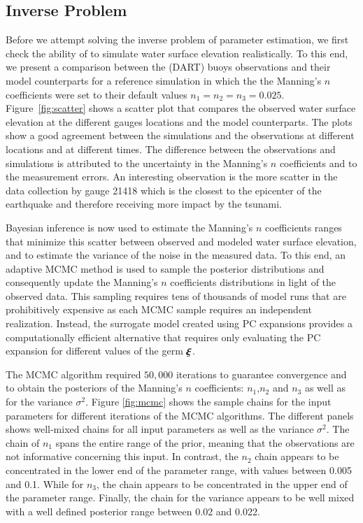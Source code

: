 \subsection{Inverse Problem} 
\label{sec:inverse}

Before we attempt solving the inverse problem of parameter estimation, 
we first check the ability of \geoclaw to simulate water surface elevation
realistically. To this end, we present a comparison between the 
(DART) buoys observations  and their \geoclaw model counterparts
for a reference simulation in which the  the Manning's $n$ coefficients were set to their default values $n_1=n_2=n_3=0.025$. Figure~\ref{fig:scatter} 
shows a scatter plot that compares the observed 
water surface elevation at the different gauges locations and the  \geoclaw model counterparts. 
The plots show a good agreement between the simulations and the 
observations at different locations and at different times. 
The difference between the observations and simulations is attributed to the uncertainty in the 
Manning's $n$ coefficients and to the measurement errors.
\alert{An interesting observation is the more scatter in the data collection by gauge 21418 which is the closest to
the epicenter of the earthquake and therefore receiving more impact by the tsunami.}

Bayesian inference is now used to estimate the Manning's 
$n$ coefficients ranges that minimize this scatter between 
observed and modeled water surface elevation, and to estimate the variance of the noise in the measured data.
To this end, an adaptive MCMC method is used to sample 
the posterior distributions \citep{Gareth2009,Haario2001} and consequently 
update the Manning's $n$ coefficients distributions in light of the 
observed data. This sampling requires tens of thousands of 
\geoclaw model runs that are prohibitively expensive as each MCMC 
sample requires an independent \geoclaw realization. Instead,
the surrogate model created using PC expansions provides a computationally
efficient alternative that requires only evaluating the PC expansion
for different values of the germ $\xxi$.

The MCMC algorithm required $50,000$ iterations to guarantee convergence
and to obtain the posteriors of the Manning's $n$ coefficients: 
$n_1$,$n_2$ and $n_3$ as well as for the variance $\sigma^2$. Figure \ref{fig:mcmc} 
shows the sample chains for the input parameters for different iterations of the MCMC algorithms. 
The different panels shows well-mixed chains for all input parameters as well as the variance $\sigma^2$.
The chain of  $n_{1}$ spans the entire range of the prior, meaning that the observations are not informative 
concerning this input.  In contrast, the $n_{2}$ chain appears to be concentrated in the 
lower end of the parameter range, with values between 0.005 and 0.1. 
While for $n_{3}$, the chain appears to be concentrated in the 
upper end of the parameter range. Finally, the chain for the variance 
appears to be well mixed with a well defined posterior range between 0.02 and 0.022.


